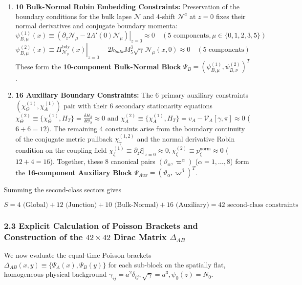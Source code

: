 \documentclass[aps,prd,onecolumn,superscriptaddress,nofootinbib,longbibliography,10pt]{revtex4-2}
\begin{document}
\begin{enumerate}
\item \textbf{10 Bulk-Normal Robin Embedding Constraints:} Preservation of the boundary conditions for the bulk lapse \(\mathcal{N}\) and 4-shift \(\mathcal{N}^a\) at \(z = 0\) fixes their normal derivatives and conjugate boundary momenta:
    \[ \psi_{B,\mu}^{(1)}(x) \equiv \left.\left(\partial_z \mathcal{N}_\mu - 2A'(0)\mathcal{N}_\mu\right)\right|_{z=0} \approx 0 \quad (5\text{ components}, \mu \in \{0,1,2,3,5\}) \]
    \[ \psi_{B,\mu}^{(2)}(x) \equiv \left.\Pi_{\mathcal{N}_\mu}^{\text{bdy}}(x)\right|_{z=0} - 2k_{bulk}M_5^3\sqrt{\gamma}\,\mathcal{N}_\mu(x,0) \approx 0 \quad (5\text{ components}) \]
    These form the \textbf{10-component Bulk-Normal Block} \(\Psi_B = (\psi_{B,\mu}^{(1)}, \psi_{B,\nu}^{(2)})^T\).
    
\item \textbf{16 Auxiliary Boundary Constraints:} The 6 primary auxiliary constraints \((\chi_\Theta^{(1)}, \chi_A^{(1)})\) pair with their 6 secondary stationarity equations \(\chi_\Theta^{(2)} \equiv \{\chi_\Theta^{(1)}, H_T\} = \frac{\delta H_\partial}{\delta\Theta_\partial} \approx 0\) and \(\chi_A^{(2)} \equiv \{\chi_A^{(1)}, H_T\} = v_A - \mathcal{V}_A[\gamma,\pi] \approx 0\) (\(6 + 6 = 12\)). The remaining 4 constraints arise from the boundary continuity of the conjugate metric pullback \(\chi_{\tilde{\gamma}}^{(1,2)}\) and the normal derivative Robin condition on the coupling field \(\chi_\xi^{(1)} \equiv \left.\partial_z\xi\right|_{z=0} \approx 0, \chi_\xi^{(2)} \equiv p_\xi^{\text{norm}} \approx 0\) (\(12 + 4 = 16\)). Together, these 8 canonical pairs \((\vartheta_\alpha, \varpi^\alpha)\) (\(\alpha = 1,\dots,8\)) form the \textbf{16-component Auxiliary Block} \(\Psi_{Aux} = (\vartheta_\alpha, \varpi^\beta)^T\).
  
\end{enumerate}

  Summing the second-class sectors gives


  \[ S = 4\text{ (Global)} + 12\text{ (Junction)} + 10\text{ (Bulk-Normal)} + 16\text{ (Auxiliary)} = 42\text{ second-class constraints} \]
  
  
\subsubsection*{2.3 Explicit Calculation of Poisson Brackets and Construction of the \(42 \times 42\) Dirac Matrix \(\Delta_{AB}\)}

  We now evaluate the equal-time Poisson brackets \(\Delta_{AB}(x,y) \equiv \{\Psi_A(x), \Psi_B(y)\}\) for each sub-block on the spatially flat, homogeneous physical background \(\gamma_{ij} = a^2\delta_{ij}, \sqrt{\gamma} = a^3, \psi_0(z) = N_0\).
\end{document}
